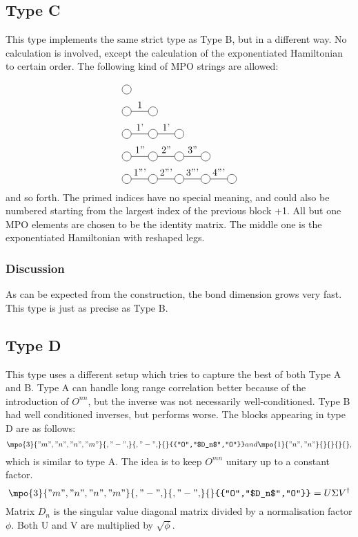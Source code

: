 \subsection{Type C}

This type implements the same strict type as Type B, but in a different way. No calculation is involved, except the calculation of the exponentiated Hamiltonian to certain order. The following kind of \Gls{MPO} strings are allowed:

\begin{equation}
  \begin{split}
    &\mpob{1}{ {,}  }{}{}{}{{,,}} \\
    &\mpob{2}{ {,"1",}  }{}{}{}{{,,}}\\
    &\mpob{3}{ {,"1'","1'",}  }{}{}{}{{,,,}}\\
    &\mpob{4}{ {,"1''","2''","3''",}  }{}{}{}{{,,,,,}}\\
    &\mpob{5}{ {,"1'''","2'''","3'''","4'''",}  }{}{}{}{{,,,,,}}\\
  \end{split}
\end{equation}
and so forth. The primed indices have no special meaning, and could also be numbered starting from the largest index of the previous block +1. All but one \Gls{MPO} elements are chosen to be the identity matrix. The middle one is the exponentiated Hamiltonian with reshaped legs.

\subsubsection*{Discussion}
As can be expected from the construction, the bond dimension grows very fast. This type is just as precise as Type B.

\subsection{Type D}

\def \rhs{\expH{2}{ $L_{n}^{-1}  M_{2n+2}  R_{n}^{-1}$ }{}{}{{"n","n"}}  }

This type uses a different setup which tries to capture the best of both Type A and B. Type A can handle long range correlation better because of the introduction of $O^{n n}$, but the inverse was not necessarily well-conditioned. Type B had well conditioned inverses, but performs worse. The blocks appearing in type D are as follows:
\begin{equation}
  \mpo{3}{{"m","n","n","m"}}{{,"-",}}{{,"-",}}{}{{"O","$D_n$","O"}} and \mpo{1}{{"n","n"}}{}{}{}{} ,
\end{equation}
which is similar to type A. The idea is to keep $O^{m n}$ unitary up to a constant factor.
\begin{equation}\label{eq_nmn_level}
  \mpo{3}{{"m","n","n","m"}}{{,"-",}}{{,"-",}}{}{{"O","$D_n$","O"}} = U \Sigma V^{ \dagger}
\end{equation}
Matrix $D_n$ is the singular value diagonal matrix divided by a normalisation factor $\phi$. Both U and V are multiplied by $  \sqrt{\phi} $.

